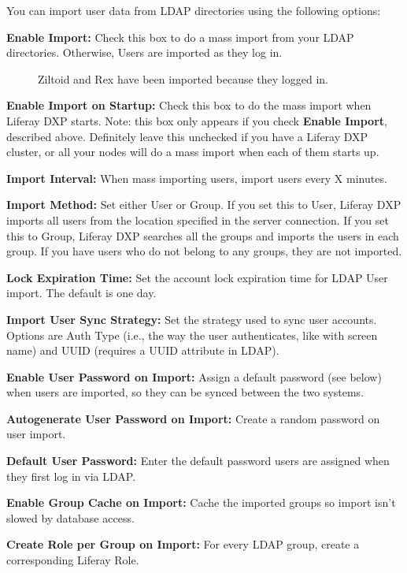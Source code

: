 You can import user data from LDAP directories using the following
options:

\textbf{Enable Import:} Check this box to do a mass import from your
LDAP directories. Otherwise, Users are imported as they log in.

\begin{figure}
\centering
{}
\caption{Ziltoid and Rex have been imported because they logged in.}
\end{figure}

\textbf{Enable Import on Startup:} Check this box to do the mass import
when Liferay DXP starts. Note: this box only appears if you check
\textbf{Enable Import}, described above. Definitely leave this unchecked
if you have a Liferay DXP cluster, or all your nodes will do a mass
import when each of them starts up.

\textbf{Import Interval:} When mass importing users, import users every
X minutes.

\textbf{Import Method:} Set either User or Group. If you set this to
User, Liferay DXP imports all users from the location specified in the
server connection. If you set this to Group, Liferay DXP searches all
the groups and imports the users in each group. If you have users who do
not belong to any groups, they are not imported.

\textbf{Lock Expiration Time:} Set the account lock expiration time for
LDAP User import. The default is one day.

\textbf{Import User Sync Strategy:} Set the strategy used to sync user
accounts. Options are Auth Type (i.e., the way the user authenticates,
like with screen name) and UUID (requires a UUID attribute in LDAP).

\textbf{Enable User Password on Import:} Assign a default password (see
below) when users are imported, so they can be synced between the two
systems.

\textbf{Autogenerate User Password on Import:} Create a random password
on user import.

\textbf{Default User Password:} Enter the default password users are
assigned when they first log in via LDAP.

\textbf{Enable Group Cache on Import:} Cache the imported groups so
import isn't slowed by database access.

\textbf{Create Role per Group on Import:} For every LDAP group, create a
corresponding Liferay Role.

